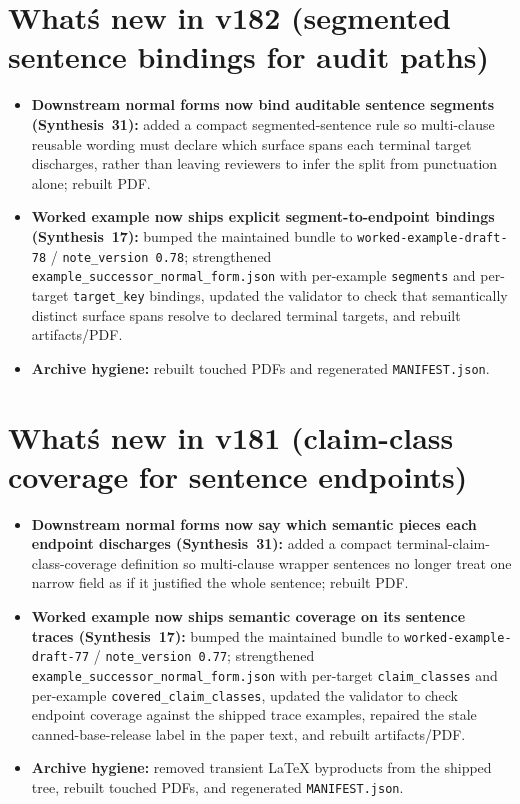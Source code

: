 \documentclass[11pt]{article}
\begin{document}
\section{What\'s new in v182 (segmented sentence bindings for audit paths)}
\begin{itemize}[leftmargin=*]
\item \textbf{Downstream normal forms now bind auditable sentence segments (Synthesis~31):} added a compact segmented-sentence rule so multi-clause reusable wording must declare which surface spans each terminal target discharges, rather than leaving reviewers to infer the split from punctuation alone; rebuilt PDF.
\item \textbf{Worked example now ships explicit segment-to-endpoint bindings (Synthesis~17):} bumped the maintained bundle to \texttt{worked-example-draft-78} / \texttt{note\_version 0.78}; strengthened \texttt{example\_successor\_normal\_form.json} with per-example \texttt{segments} and per-target \texttt{target\_key} bindings, updated the validator to check that semantically distinct surface spans resolve to declared terminal targets, and rebuilt artifacts/PDF.
\item \textbf{Archive hygiene:} rebuilt touched PDFs and regenerated \texttt{MANIFEST.json}.
\end{itemize}

\section{What\'s new in v181 (claim-class coverage for sentence endpoints)}
\begin{itemize}[leftmargin=*]
\item \textbf{Downstream normal forms now say which semantic pieces each endpoint discharges (Synthesis~31):} added a compact terminal-claim-class-coverage definition so multi-clause wrapper sentences no longer treat one narrow field as if it justified the whole sentence; rebuilt PDF.
\item \textbf{Worked example now ships semantic coverage on its sentence traces (Synthesis~17):} bumped the maintained bundle to \texttt{worked-example-draft-77} / \texttt{note\_version 0.77}; strengthened \texttt{example\_successor\_normal\_form.json} with per-target \texttt{claim\_classes} and per-example \texttt{covered\_claim\_classes}, updated the validator to check endpoint coverage against the shipped trace examples, repaired the stale canned-base-release label in the paper text, and rebuilt artifacts/PDF.
\item \textbf{Archive hygiene:} removed transient LaTeX byproducts from the shipped tree, rebuilt touched PDFs, and regenerated \texttt{MANIFEST.json}.
\end{itemize}
\end{document}
